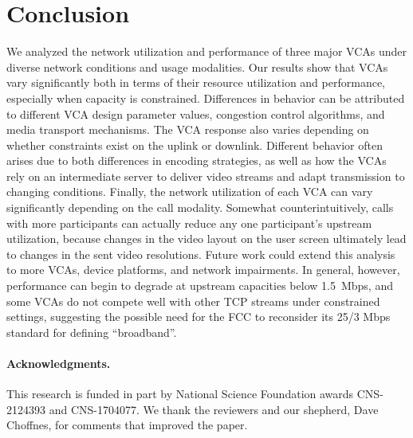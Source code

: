 \section{Conclusion}
\label{sec:conclusion}

We analyzed the network utilization and performance of three major VCAs under
diverse network conditions and usage modalities. Our results show that VCAs
vary significantly both in terms of their resource utilization and
performance, especially when capacity is constrained.  Differences in behavior
can be attributed to different VCA design parameter values, congestion control
algorithms, and media transport mechanisms. The VCA response also varies
depending on whether constraints exist on the uplink or downlink. Different
behavior often arises due to both differences in encoding strategies, as well
as how the VCAs rely on an intermediate server to deliver video streams and
adapt transmission to changing conditions. Finally, the network utilization of
each VCA can vary significantly depending on the call modality. Somewhat
counterintuitively, calls with more participants can actually reduce any one
participant's upstream utilization, because changes in the video layout on the
user screen ultimately lead to changes in the sent video resolutions. Future
work could extend this analysis to more VCAs, device platforms, and network
impairments. In general, however, performance can begin to degrade at upstream
capacities below 1.5~Mbps, and some VCAs do not compete well with other TCP
streams under constrained settings, suggesting the possible need for the FCC
to reconsider its 25/3 Mbps standard for defining ``broadband''.

\paragraph{Acknowledgments.} This research is funded in part by National
Science Foundation awards CNS-2124393 and CNS-1704077. We thank the reviewers
and our shepherd, Dave Choffnes, for comments that improved the paper.
